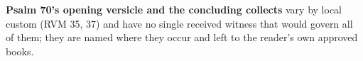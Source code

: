 \textbf{Psalm 70's opening versicle and the concluding collects} vary by
local custom (RVM 35, 37) and have no single received witness that would
govern all of them; they are named where they occur and left to the
reader's own approved books.
